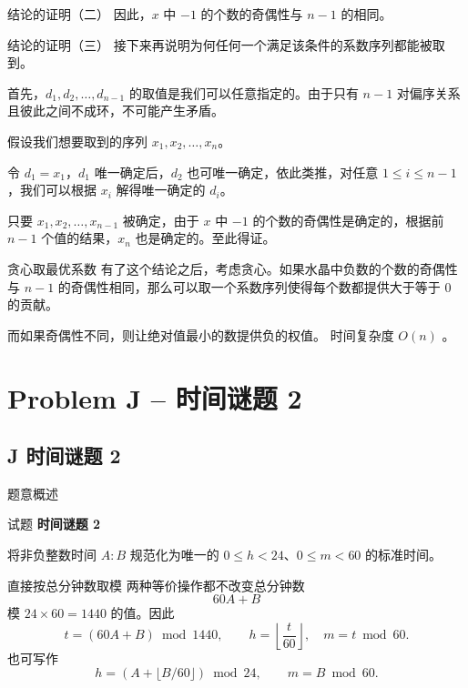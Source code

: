 \documentclass{beamer}
\newcommand{\TT}[1]{{\ttfamily #1}}
\newcommand{\BF}[1]{\textbf{#1}}
\begin{document}
{{\begin{frame}{结论的证明（二）}
  \vspace{0.5em}
  因此，$x$ 中 $-1$ 的个数的奇偶性与 $n-1$ 的相同。
\end{frame}

\begin{frame}{结论的证明（三）}
  接下来再说明为何任何一个满足该条件的系数序列都能被取到。

  \vspace{0.5em}
  首先，$d_1,d_2,\ldots,d_{n-1}$ 的取值是我们可以任意指定的。由于只有 $n-1$ 对偏序关系且彼此之间不成环，不可能产生矛盾。

  \vspace{0.5em}
  假设我们想要取到的序列 $x_1,x_2,\ldots,x_n$。

  \vspace{0.5em}
  令 $d_1=x_1$，$d_1$ 唯一确定后，$d_2$ 也可唯一确定，依此类推，对任意 $1\le i\le n-1$，我们可以根据 $x_i$ 解得唯一确定的 $d_i$。

  \vspace{0.5em}
  只要 $x_1,x_2,\ldots,x_{n-1}$ 被确定，由于 $x$ 中 $-1$ 的个数的奇偶性是确定的，根据前 $n-1$ 个值的结果，$x_n$ 也是确定的。至此得证。
\end{frame}

\begin{frame}{贪心取最优系数}
  有了这个结论之后，考虑贪心。如果水晶中负数的个数的奇偶性与 $n-1$ 的奇偶性相同，那么可以取一个系数序列使得每个数都提供大于等于 $0$ 的贡献。

  \vspace{0.5em}
  而如果奇偶性不同，则让绝对值最小的数提供负的权值。
  时间复杂度 $O(n)$ 。
\end{frame}}


{
\section[J]{Problem J -- 时间谜题 2}
\subsection{J 时间谜题 2}
\begin{frame}{题意概述}
  \begin{center}试题 \myboxx{\BF{\TT{J}}} \BF{时间谜题 2}\end{center}
  将非负整数时间 $A{:}B$ 规范化为唯一的
  $0\le h<24$、$0\le m<60$ 的标准时间。
\end{frame}

\begin{frame}{直接按总分钟数取模}
  两种等价操作都不改变总分钟数
  \[
    60A+B
  \]
  模 $24\times60=1440$ 的值。因此
  \[
    t=(60A+B)\bmod1440,\qquad
    h=\left\lfloor\frac{t}{60}\right\rfloor,\quad m=t\bmod60.
  \]
  也可写作
  \[
    h=(A+\lfloor B/60\rfloor)\bmod24,\qquad m=B\bmod60.
  \]


\end{frame}}}
\end{document}
